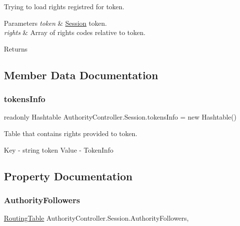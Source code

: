 Trying to load rights registred for token. 


\begin{DoxyParams}{Parameters}
{\em token} & \mbox{\hyperlink{class_authority_controller_1_1_session}{Session}} token.\\
\hline
{\em rights} & Array of rights\textquotesingle{} codes relative to token.\\
\hline
\end{DoxyParams}
\begin{DoxyReturn}{Returns}

\end{DoxyReturn}


\subsection{Member Data Documentation}
\mbox{\label{class_authority_controller_1_1_session_ab31f50a3b13fd88c44be84c0243ef6f9}} 
\subsubsection{\texorpdfstring{tokens\+Info}{tokensInfo}}
{\footnotesize\ttfamily readonly Hashtable Authority\+Controller.\+Session.\+tokens\+Info = new Hashtable()\hspace{0.3cm}{\ttfamily [private]}}



Table that contains rights provided to token. 

Key -\/ string token Value -\/ Token\+Info 

\subsection{Property Documentation}
\mbox{\label{class_authority_controller_1_1_session_a6a8a683e8b0d236d2808cbd9130c0b99}} 
\subsubsection{\texorpdfstring{Authority\+Followers}{AuthorityFollowers}}
{\footnotesize\ttfamily \mbox{\hyperlink{class_pipes_provider_1_1_networking_1_1_routing_1_1_routing_table}{Routing\+Table}} Authority\+Controller.\+Session.\+Authority\+Followers\hspace{0.3cm}{\ttfamily [get]}, {\ttfamily [set]}}



